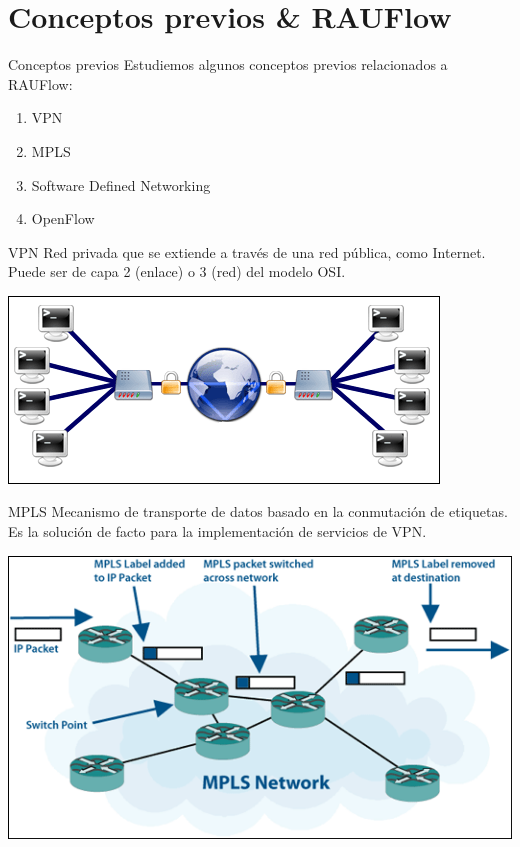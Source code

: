 \documentclass[xcolor=svgnames]{beamer}
\begin{document}
\section{Conceptos previos \& RAUFlow}

\begin{frame}{}
	\tableofcontents[currentsection]
\end{frame}

\begin{frame}{Conceptos previos}
	Estudiemos algunos conceptos previos relacionados a RAUFlow:
	\begin{enumerate}
		\item VPN
		\item MPLS
		\item Software Defined Networking
		\item OpenFlow
	\end{enumerate}
\end{frame}

\begin{frame}{VPN}
	Red privada que se extiende a través de una red pública, como Internet. Puede ser de capa 2 (enlace) o 3 (red) del modelo OSI.
	\begin{center}
		\includegraphics[scale=0.8]{vpn}
	\end{center}
\end{frame}

\begin{frame}{MPLS}
	Mecanismo de transporte de datos basado en la conmutación de etiquetas. Es la solución de facto para la implementación de servicios de VPN.
	\begin{center}
		\includegraphics[scale=0.6]{mpls}
	\end{center}
\end{frame}
\end{document}

